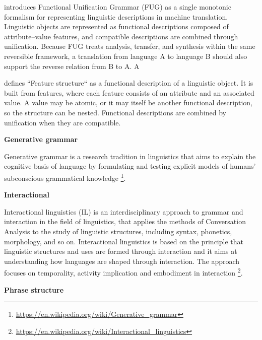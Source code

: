 \documentclass{book}
\providecommand{\ProjectDeepHeading}[2]{%
    \par\medskip\noindent\textbf{#2}\par\smallskip
}
\providecommand{\seeherefooter}[1]{\footnote{\url{#1}}}
\begin{document}
    \cite{kay-1984-functional-unification-grammar} introduces Functional Unification Grammar (FUG) as a single monotonic formalism for representing linguistic descriptions in machine translation. Linguistic objects are represented as functional descriptions composed of attribute--value features, and compatible descriptions are combined through unification. Because FUG treats analysis, transfer, and synthesis within the same reversible framework, a translation from language A to language B should also support the reverse relation from B to A. A
    
    \cite{kay-1984-functional-unification-grammar} defines ``Feature structure`` as a functional description of a linguistic object. It is built from features, where each feature consists of an attribute and an associated value. A value may be atomic, or it may itself be another functional description, so the structure can be nested. Functional descriptions are combined by unification when they are compatible.

\ProjectDeepHeading{5}{Generative grammar}


Generative grammar is a research tradition in linguistics that aims to explain the cognitive basis of language by formulating and testing explicit models of humans' subconscious grammatical knowledge \seeherefooter{https://en.wikipedia.org/wiki/Generative_grammar}.

\ProjectDeepHeading{5}{Interactional}


Interactional linguistics (IL) is an interdisciplinary approach to grammar and interaction in the field of linguistics, that applies the methods of Conversation Analysis to the study of linguistic structures, including syntax, phonetics, morphology, and so on. Interactional linguistics is based on the principle that linguistic structures and uses are formed through interaction and it aims at understanding how languages are shaped through interaction. The approach focuses on temporality, activity implication and embodiment in interaction \seeherefooter{https://en.wikipedia.org/wiki/Interactional_linguistics}.
%    
%

\ProjectDeepHeading{5}{Phrase structure}

\end{document}
